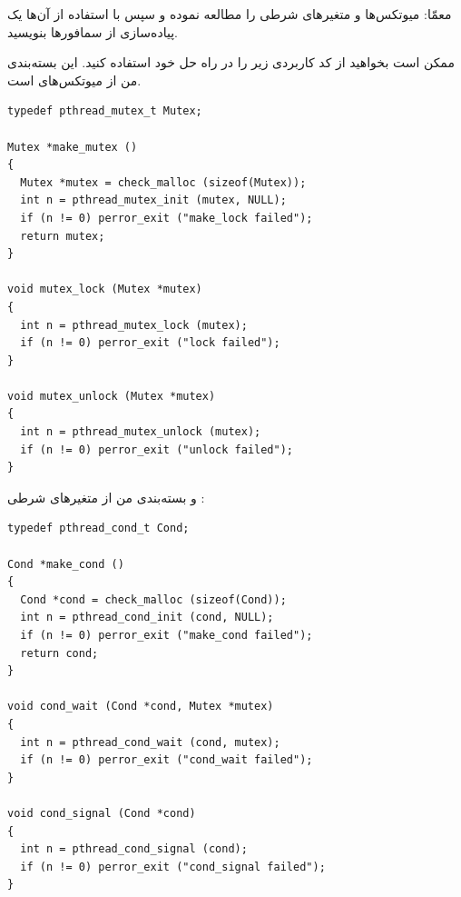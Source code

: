 \documentclass{book}
\newcommand{\clearemptydoublepage}{\newpage\cleardoublepage}
\begin{document}
    معمّا: میوتکس‌ها و متغیرهای شرطی را مطالعه نموده و سپس با استفاده از آن‌ها یک پیاده‌سازی از سمافورها بنویسید. 

    ممکن است بخواهید از کد کاربردی زیر را در راه حل خود استفاده کنید. 
    این بسته‌بندی من از میوتکس‌های  است.

\begin{latin}
\begin{lstlisting}
typedef pthread_mutex_t Mutex;

Mutex *make_mutex ()
{
  Mutex *mutex = check_malloc (sizeof(Mutex));
  int n = pthread_mutex_init (mutex, NULL);
  if (n != 0) perror_exit ("make_lock failed"); 
  return mutex;
}

void mutex_lock (Mutex *mutex)
{
  int n = pthread_mutex_lock (mutex);
  if (n != 0) perror_exit ("lock failed");
}

void mutex_unlock (Mutex *mutex)
{
  int n = pthread_mutex_unlock (mutex);
  if (n != 0) perror_exit ("unlock failed");
}
\end{lstlisting}
\end{latin}

\newpage
    و بسته‌بندی من از متغیرهای شرطی :


\begin{latin}
\begin{lstlisting}
typedef pthread_cond_t Cond;

Cond *make_cond ()
{
  Cond *cond = check_malloc (sizeof(Cond)); 
  int n = pthread_cond_init (cond, NULL);
  if (n != 0) perror_exit ("make_cond failed");
  return cond;
}

void cond_wait (Cond *cond, Mutex *mutex)
{
  int n = pthread_cond_wait (cond, mutex);
  if (n != 0) perror_exit ("cond_wait failed");
}

void cond_signal (Cond *cond)
{
  int n = pthread_cond_signal (cond);
  if (n != 0) perror_exit ("cond_signal failed");
}
\end{lstlisting}
\end{latin}



\clearemptydoublepage
\end{document}
